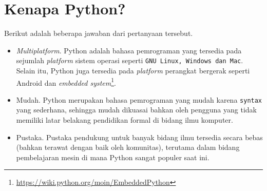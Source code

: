 \section{Kenapa Python?}
Berikut adalah beberapa jawaban dari pertanyaan tersebut.
\begin{itemize}
  \item \textit{Multiplatform}. Python adalah bahasa pemrograman yang tersedia pada sejumlah \textit{platform} sistem operasi seperti \texttt{GNU Linux, Windows dan Mac}. Selain itu, Python juga tersedia pada \textit{platform} perangkat bergerak seperti Android dan \textit{embedded system}\footnote{\url{https://wiki.python.org/moin/EmbeddedPython}}.
  \item Mudah. Python merupakan bahasa pemrograman yang mudah karena \texttt{syntax} yang sederhana, sehingga mudah dikuasai bahkan oleh pengguna yang tidak memiliki latar belakang pendidikan formal di bidang ilmu komputer.
  \item Pustaka. Pustaka pendukung untuk banyak bidang ilmu tersedia secara bebas (bahkan terawat dengan baik oleh komunitas), terutama dalam bidang pembelajaran mesin di mana Python sangat populer saat ini.
\end{itemize}
